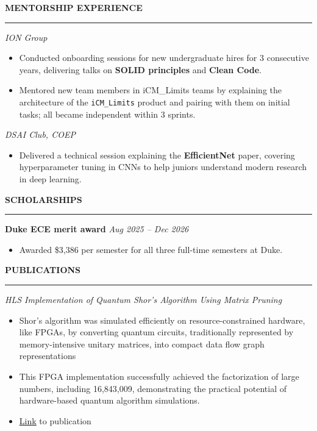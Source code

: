 \documentclass[a4paper,10pt]{article}
\let\oldhref\href
\renewcommand{\href}[2]{\oldhref{#1}{\uline{#2}}}
\newcommand{\cvHeaderOne}[1]{%
  \vspace*{1.5em}%
  {\noindent\large\textbf{\MakeUppercase{#1}}\par}%
  \noindent\rule{\linewidth}{0.4pt}%
  \vspace*{0.5em}%
}
\newcommand{\cvHeaderTwo}[2]{%
  \vspace{0.8em}%
  \noindent\textbf{\normalsize #1} \hfill \textit{#2}\par%
}
\newcommand{\cvHeaderThree}[1]{%
  \noindent\textit{#1}%
}
\newenvironment{cvItemList}{%
  \begin{itemize}%
    \setlength{\itemsep}{0.1em}%
    \setlength{\topsep}{0em}%
    \setlength{\partopsep}{0em}%
    \setlength{\parsep}{0em}%
    \setlength{\parskip}{0em}%
}{%
  \end{itemize}%
}
\begin{document}
\cvHeaderOne{Mentorship Experience}

\cvHeaderThree{ION Group}
\begin{cvItemList}
  \item Conducted onboarding sessions for new undergraduate hires for 3 consecutive years, delivering talks on \textbf{SOLID principles} and \textbf{Clean Code}.
  \item Mentored new team members in iCM\_Limits teams by explaining the architecture of the \texttt{iCM\_Limits} product and pairing with them on initial tasks; all became independent within 3 sprints.
\end{cvItemList}

\cvHeaderThree{DSAI Club, COEP}
\begin{cvItemList}
  \item Delivered a technical session explaining the \textbf{EfficientNet} paper, covering hyperparameter tuning in CNNs to help juniors understand modern research in deep learning.
\end{cvItemList}

\cvHeaderOne{Scholarships}
\cvHeaderTwo{Duke ECE merit award}{Aug 2025 -- Dec 2026}
\begin{cvItemList}
  \item Awarded \$3{,}386 per semester for all three full-time semesters at Duke.
\end{cvItemList}

\newpage

\cvHeaderOne{Publications}

\cvHeaderThree{HLS Implementation of Quantum Shor’s Algorithm Using Matrix Pruning}
\begin{cvItemList}
\item Shor's algorithm was simulated efficiently on resource-constrained hardware, like FPGAs, by converting quantum circuits, traditionally represented by memory-intensive unitary matrices, into compact data flow graph representations
\item This FPGA implementation successfully achieved the factorization of large numbers, including 16,843,009, demonstrating the practical potential of hardware-based quantum algorithm simulations.
\item \href{https://ieeexplore.ieee.org/document/9807860}{Link} to publication
\end{cvItemList}
\end{document}
